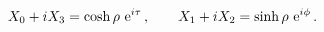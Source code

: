 \begin{equation}
X_0 + i X_3 = \cosh \rho \ {\rm e}^{i \tau}
\, , \qquad
X_1 + i X_2 = \sinh \rho \ {\rm e}^{i \phi}
\, .
\end{equation}

